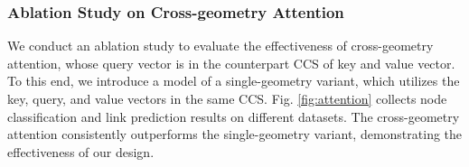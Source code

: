 
       \vspace{-0.05in}
\subsubsection{\textbf{Ablation Study on Cross-geometry Attention}}
We conduct an ablation study to evaluate the effectiveness of cross-geometry attention, 
whose query vector is in the counterpart CCS of key and value vector.
To this end, we introduce a model of a single-geometry variant, which utilizes the key, query, and value vectors in the same CCS.
Fig. \ref{fig:attention} collects node classification and link prediction results on different datasets.
The cross-geometry attention consistently outperforms the single-geometry variant, demonstrating the effectiveness of our design.




       \vspace{-0.05in}
